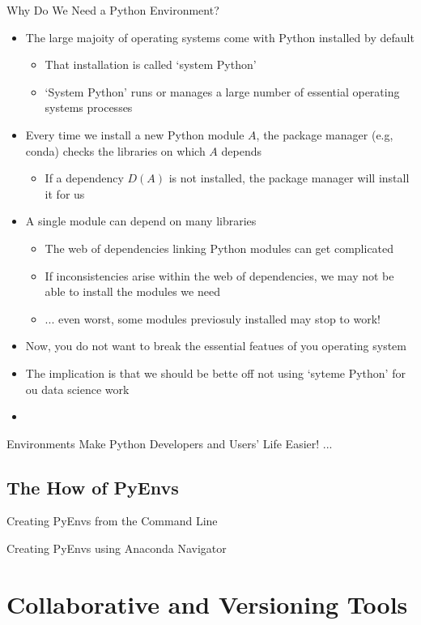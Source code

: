 \documentclass[aspectratio=1610]{beamer}
\begin{document}
\begin{frame}[c]{Why Do We Need a Python Environment?}
	\begin{itemize}
		\item The large majoity of operating systems come with Python installed by default
		\begin{itemize}
			\item That installation is called `system Python'
			\item `System Python' runs or manages a large number of essential operating systems processes
		\end{itemize}
		\item  Every time we install a new Python module $A$, the package manager (e.g, conda) checks the libraries on which $A$ depends
		\begin{itemize}
			\item If a dependency $D(A)$ is not installed, the package manager will install it for us
	        \end{itemize}
		\item A single module can depend on many libraries
		\begin{itemize}
			\item The web of dependencies linking Python modules can get complicated
			\item If inconsistencies arise within the web of dependencies, we may not be able to install the modules we need
			\item ... even worst, some modules previosuly installed may stop to work!
		\end{itemize}
		\item Now, you do not want to break the essential featues of you operating system
		\item The implication is that we should be bette off not using `syteme Python' for ou data science work
		\item 
	\end{itemize}
\end{frame}

\begin{frame}[c]{Environments Make Python Developers and Users' Life Easier!}
...
\end{frame}

\subsection{The How of PyEnvs}

\begin{frame}[c]{Creating PyEnvs from the Command Line}	
\end{frame}

\begin{frame}[c]{Creating PyEnvs using Anaconda Navigator}	
\end{frame}


\section{Collaborative and Versioning Tools}
\end{document}
